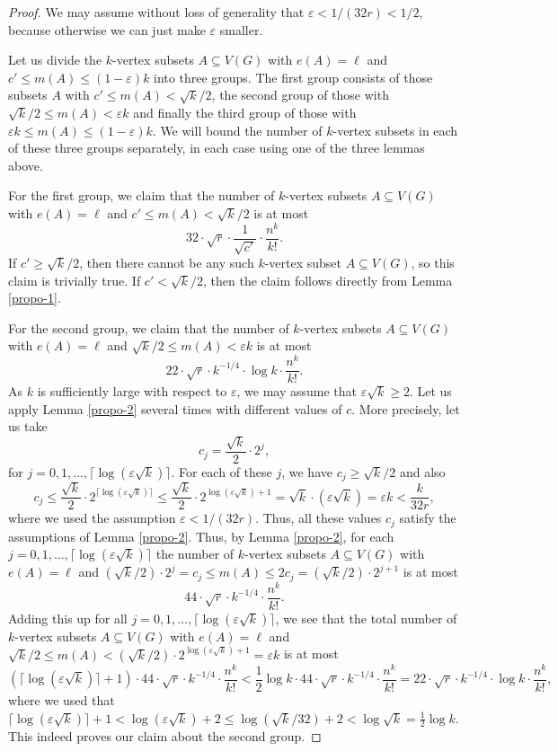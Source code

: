 \begin{proof}We may assume without loss of generality that $\varepsilon<1/(32r)<1/2$, because otherwise we can just make $\varepsilon$ smaller.

Let us divide the $k$-vertex subsets $A\subseteq V(G)$ with $e(A)=\ell$ and $c' \leq m(A)\leq (1-\varepsilon) k$ into three groups. The first group consists of those subsets $A$ with $c' \leq m(A)< \sqrt{k}/2$, the second group of those with $\sqrt{k}/2\leq m(A)< \varepsilon k$ and finally the third group of those with $\varepsilon k\leq m(A)\leq (1-\varepsilon) k$. We will bound the number of $k$-vertex subsets in each of these three groups separately, in each case using one of the three lemmas above.

For the first group, we claim that the number of $k$-vertex subsets $A\subseteq V(G)$ with $e(A)=\ell$ and $c'\leq m(A)<\sqrt{k}/2$ is at most
\[32\cdot \sqrt{r}\cdot \frac{1}{\sqrt{c'}}\cdot \frac{n^k}{k!}.\]
If $c'\geq \sqrt{k}/2$, then there cannot be any such $k$-vertex subset $A\subseteq V(G)$, so this claim is trivially true. If $c'< \sqrt{k}/2$, then the claim follows directly from Lemma \ref{propo-1}.

For the second group, we claim that the number of $k$-vertex subsets $A\subseteq V(G)$ with $e(A)=\ell$ and $\sqrt{k}/2\leq m(A)< \varepsilon k$ is at most
\[22 \cdot \sqrt{r}\cdot k^{-1/4}\cdot \log k\cdot \frac{n^k}{k!}.\]
As $k$ is sufficiently large with respect to $\varepsilon$, we may assume that $\varepsilon\sqrt{k}\geq 2$. Let us apply Lemma \ref{propo-2} several times with different values of $c$. More precisely, let us take
\[c_j=\frac{\sqrt{k}}{2}\cdot 2^j,\]
for $j=0,1,\dots,\lceil \log (\varepsilon \sqrt{k})\rceil$. For each of these $j$, we have $c_j\geq \sqrt{k}/2$ and also
\[c_j\leq \frac{\sqrt{k}}{2}\cdot 2^{\lceil \log (\varepsilon \sqrt{k})\rceil}\leq \frac{\sqrt{k}}{2}\cdot 2^{\log (\varepsilon \sqrt{k})+1}=\sqrt{k}\cdot (\varepsilon \sqrt{k})=\varepsilon k<\frac{k}{32r},\]
where we used the assumption $\varepsilon<1/(32r)$. Thus, all these values $c_j$  satisfy the assumptions of Lemma \ref{propo-2}.  Thus, by Lemma \ref{propo-2}, for each $j=0,1,\dots,\lceil \log (\varepsilon \sqrt{k})\rceil$ the number of $k$-vertex subsets $A\subseteq V(G)$ with $e(A)=\ell$ and $(\sqrt{k}/2)\cdot 2^j=c_j\leq m(A)\leq 2c_j=(\sqrt{k}/2)\cdot 2^{j+1}$ is at most
\[44\cdot \sqrt{r}\cdot k^{-1/4}\cdot \frac{n^k}{k!}.\]
Adding this up for all $j=0,1,\dots,\lceil \log (\varepsilon \sqrt{k})\rceil$, we see that the total number of $k$-vertex subsets $A\subseteq V(G)$ with $e(A)=\ell$ and $\sqrt{k}/2\leq m(A)< (\sqrt{k}/2)\cdot 2^{\log (\varepsilon \sqrt{k})+1}=\varepsilon k$ is at most
\[\left(\lceil\log (\varepsilon \sqrt{k})\rceil+1\right)\cdot 44\cdot \sqrt{r}\cdot k^{-1/4}\cdot \frac{n^k}{k!}< \frac{1}{2}\log k\cdot 44\cdot \sqrt{r}\cdot k^{-1/4}\cdot \frac{n^k}{k!}=22 \cdot \sqrt{r}\cdot k^{-1/4}\cdot \log k\cdot \frac{n^k}{k!},\]
where we used that $\lceil\log (\varepsilon \sqrt{k})\rceil+1< \log (\varepsilon \sqrt{k})+2\leq \log (\sqrt{k}/32)+2<\log \sqrt{k}=\frac{1}{2}\log k$. This indeed proves our claim about the second group.


\end{proof}
